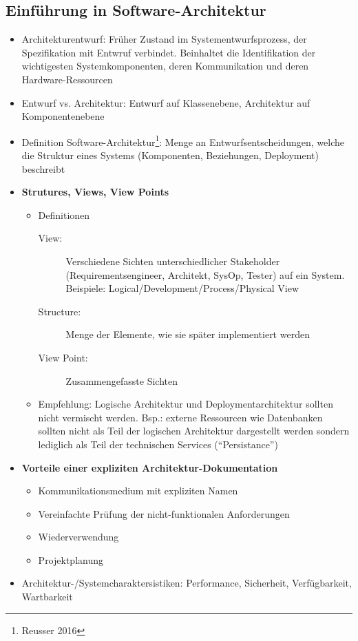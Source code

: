 \subsection{Einführung in Software-Architektur}
\begin{itemize}
	\item Architekturentwurf: Früher Zustand im Systementwurfsprozess, der Spezifikation mit Entwruf verbindet. Beinhaltet die Identifikation der wichtigesten Systemkomponenten, deren Kommunikation und deren Hardware-Ressourcen
	\item Entwurf vs. Architektur: Entwurf auf Klassenebene, Architektur auf Komponentenebene %
	\item Definition Software-Architektur\footnote{Reusser 2016}: Menge an Entwurfsentscheidungen, welche die Struktur eines Systems (Komponenten, Beziehungen, Deployment) beschreibt
	\item \textbf{Strutures, Views, View Points}
	\begin{itemize}
		\item Definitionen %
		\begin{description}
			\item[View:] Verschiedene Sichten unterschiedlicher Stakeholder (Requirementsengineer, Architekt, SysOp, Tester) auf ein System. Beispiele: Logical/Development/Process/Physical View
			\item[Structure:] Menge der Elemente, wie sie später implementiert werden
			\item[View Point:] Zusammengefasste Sichten
		\end{description}
		\item Empfehlung: Logische Architektur und Deploymentarchitektur sollten nicht vermischt werden. Bsp.: externe Ressourcen wie Datenbanken sollten nicht als Teil der logischen Architektur dargestellt werden sondern lediglich als Teil der technischen Services ("`Persistance"')
	\end{itemize}
	\item \textbf{Vorteile einer expliziten Architektur-Dokumentation}
	\begin{itemize}
		\item Kommunikationsmedium mit expliziten Namen
		\item Vereinfachte Prüfung der nicht-funktionalen Anforderungen
		\item Wiederverwendung
		\item Projektplanung
	\end{itemize}
	\item Architektur-/Systemcharaktersistiken: Performance, Sicherheit, Verfügbarkeit, Wartbarkeit
\end{itemize}




